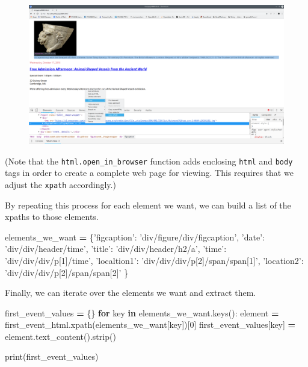\documentclass[]{book}
\newenvironment{Shaded}{\begin{snugshade}}{\end{snugshade}}
\newcommand{\KeywordTok}[1]{\textcolor[rgb]{0.13,0.29,0.53}{\textbf{#1}}}
\newcommand{\DecValTok}[1]{\textcolor[rgb]{0.00,0.00,0.81}{#1}}
\newcommand{\StringTok}[1]{\textcolor[rgb]{0.31,0.60,0.02}{#1}}
\newcommand{\ControlFlowTok}[1]{\textcolor[rgb]{0.13,0.29,0.53}{\textbf{#1}}}
\newcommand{\OperatorTok}[1]{\textcolor[rgb]{0.81,0.36,0.00}{\textbf{#1}}}
\newcommand{\BuiltInTok}[1]{#1}
\newcommand{\NormalTok}[1]{#1}
\begin{document}
\begin{figure}
\centering
\includegraphics{Python/PythonWebScrape/images/dev_tools_figcaption.png}
\caption{}
\end{figure}

(Note that the \texttt{html.open\_in\_browser} function adds enclosing
\texttt{html} and \texttt{body} tags in order to create a complete web
page for viewing. This requires that we adjust the \texttt{xpath}
accordingly.)

By repeating this process for each element we want, we can build a list
of the xpaths to those elements.

\begin{Shaded}
\begin{Highlighting}[]
\NormalTok{elements_we_want }\OperatorTok{=}\NormalTok{ \{}\StringTok{'figcaption'}\NormalTok{: }\StringTok{'div/figure/div/figcaption'}\NormalTok{,}
                    \StringTok{'date'}\NormalTok{: }\StringTok{'div/div/header/time'}\NormalTok{,}
                    \StringTok{'title'}\NormalTok{: }\StringTok{'div/div/header/h2/a'}\NormalTok{,}
                    \StringTok{'time'}\NormalTok{: }\StringTok{'div/div/div/p[1]/time'}\NormalTok{,}
                    \StringTok{'localtion1'}\NormalTok{: }\StringTok{'div/div/div/p[2]/span/span[1]'}\NormalTok{,}
                    \StringTok{'location2'}\NormalTok{: }\StringTok{'div/div/div/p[2]/span/span[2]'}
\NormalTok{                    \}}
\end{Highlighting}
\end{Shaded}

Finally, we can iterate over the elements we want and extract them.

\begin{Shaded}
\begin{Highlighting}[]
\NormalTok{first_event_values }\OperatorTok{=}\NormalTok{ \{\}}
\ControlFlowTok{for}\NormalTok{ key }\KeywordTok{in}\NormalTok{ elements_we_want.keys():}
\NormalTok{    element }\OperatorTok{=}\NormalTok{ first_event_html.xpath(elements_we_want[key])[}\DecValTok{0}\NormalTok{]}
\NormalTok{    first_event_values[key] }\OperatorTok{=}\NormalTok{ element.text_content().strip()}

\BuiltInTok{print}\NormalTok{(first_event_values)}
\end{Highlighting}
\end{Shaded}
\end{document}
